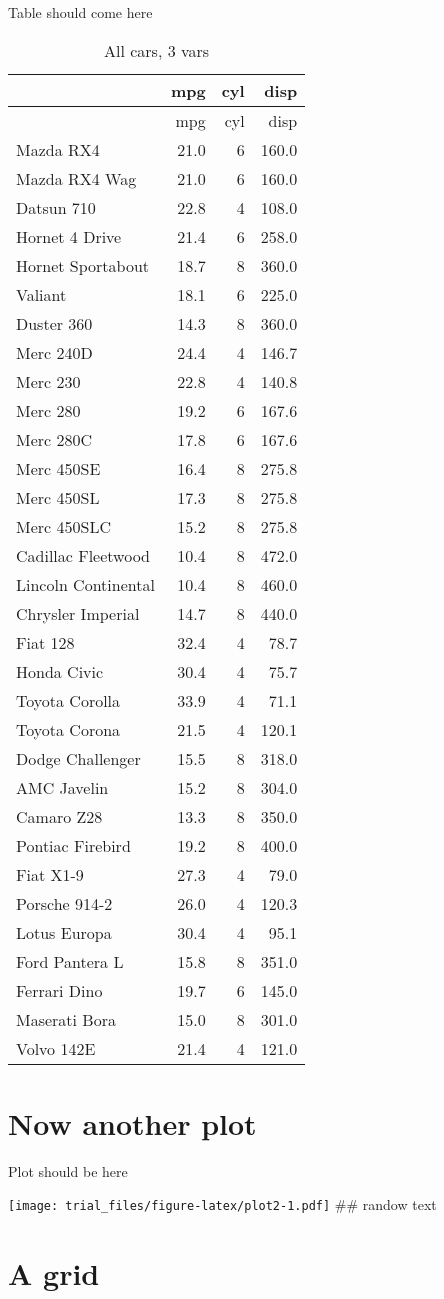 \documentclass[]{article}
\begin{document}
\lipsum

Table should come here

\begin{longtable}[]{@{}lrrr@{}}
\caption{All cars, 3 vars}\tabularnewline
\toprule
& mpg & cyl & disp\tabularnewline
\midrule
\endfirsthead
\toprule
& mpg & cyl & disp\tabularnewline
\midrule
\endhead
Mazda RX4 & 21.0 & 6 & 160.0\tabularnewline
Mazda RX4 Wag & 21.0 & 6 & 160.0\tabularnewline
Datsun 710 & 22.8 & 4 & 108.0\tabularnewline
Hornet 4 Drive & 21.4 & 6 & 258.0\tabularnewline
Hornet Sportabout & 18.7 & 8 & 360.0\tabularnewline
Valiant & 18.1 & 6 & 225.0\tabularnewline
Duster 360 & 14.3 & 8 & 360.0\tabularnewline
Merc 240D & 24.4 & 4 & 146.7\tabularnewline
Merc 230 & 22.8 & 4 & 140.8\tabularnewline
Merc 280 & 19.2 & 6 & 167.6\tabularnewline
Merc 280C & 17.8 & 6 & 167.6\tabularnewline
Merc 450SE & 16.4 & 8 & 275.8\tabularnewline
Merc 450SL & 17.3 & 8 & 275.8\tabularnewline
Merc 450SLC & 15.2 & 8 & 275.8\tabularnewline
Cadillac Fleetwood & 10.4 & 8 & 472.0\tabularnewline
Lincoln Continental & 10.4 & 8 & 460.0\tabularnewline
Chrysler Imperial & 14.7 & 8 & 440.0\tabularnewline
Fiat 128 & 32.4 & 4 & 78.7\tabularnewline
Honda Civic & 30.4 & 4 & 75.7\tabularnewline
Toyota Corolla & 33.9 & 4 & 71.1\tabularnewline
Toyota Corona & 21.5 & 4 & 120.1\tabularnewline
Dodge Challenger & 15.5 & 8 & 318.0\tabularnewline
AMC Javelin & 15.2 & 8 & 304.0\tabularnewline
Camaro Z28 & 13.3 & 8 & 350.0\tabularnewline
Pontiac Firebird & 19.2 & 8 & 400.0\tabularnewline
Fiat X1-9 & 27.3 & 4 & 79.0\tabularnewline
Porsche 914-2 & 26.0 & 4 & 120.3\tabularnewline
Lotus Europa & 30.4 & 4 & 95.1\tabularnewline
Ford Pantera L & 15.8 & 8 & 351.0\tabularnewline
Ferrari Dino & 19.7 & 6 & 145.0\tabularnewline
Maserati Bora & 15.0 & 8 & 301.0\tabularnewline
Volvo 142E & 21.4 & 4 & 121.0\tabularnewline
\bottomrule
\end{longtable}

\section{Now another plot}\label{now-another-plot}

Plot should be here

\texttt{[image: trial\_files/figure-latex/plot2-1.pdf]} \#\# randow text

\lipsum

\section{A grid}\label{a-grid}
\end{document}
